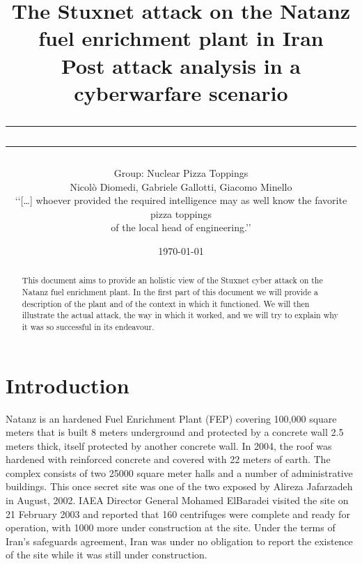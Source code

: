 \documentclass[12pt]{article}
\title{The Stuxnet attack on the Natanz fuel enrichment plant in Iran\\
\large{Post attack analysis in a cyberwarfare scenario}
\rule[0.1cm]{13cm}{0.1mm}
\rule[0.5cm]{13.5cm}{0.6mm}}
\author{Group: Nuclear Pizza Toppings \\
Nicolò Diomedi, Gabriele Gallotti, Giacomo Minello
\\
\scriptsize‘‘[…] whoever provided the required intelligence may as well know the favorite pizza toppings \\
\scriptsize of the local head of engineering.’’\cite{killcentrifuge}
\\
}
\date{\today}
\date{}
\begin{document}
\begin{titlepage}
\maketitle
\begin{abstract}
\noindent  This document aims to provide an holistic view of the Stuxnet cyber attack on the Natanz fuel enrichment plant.
In the first part of this document we will provide a description of the plant and of the context in which it functioned. 
We will then illustrate the actual attack, the way in which it worked, and we will try to explain why it was so successful in its endeavour.
\end{abstract}
\end{titlepage}


\tableofcontents

\listoffigures

\newpage

\section{Introduction}
Natanz is an hardened Fuel Enrichment Plant (FEP) covering 100,000 square meters that is built 8 meters underground and protected by a concrete wall 2.5 meters thick, itself protected by another concrete wall. In 2004, the roof was hardened with reinforced concrete and covered with 22 meters of earth. The complex consists of two 25000 square meter halls and a number of administrative buildings. This once secret site was one of the two exposed by Alireza Jafarzadeh in August, 2002. IAEA Director General Mohamed ElBaradei visited the site on 21 February 2003 and reported that 160 centrifuges were complete and ready for operation, with 1000 more under construction at the site. Under the terms of Iran’s safeguards agreement, Iran was under no obligation to report the existence of the site while it was still under construction.\cite{natanz}
\end{document}
